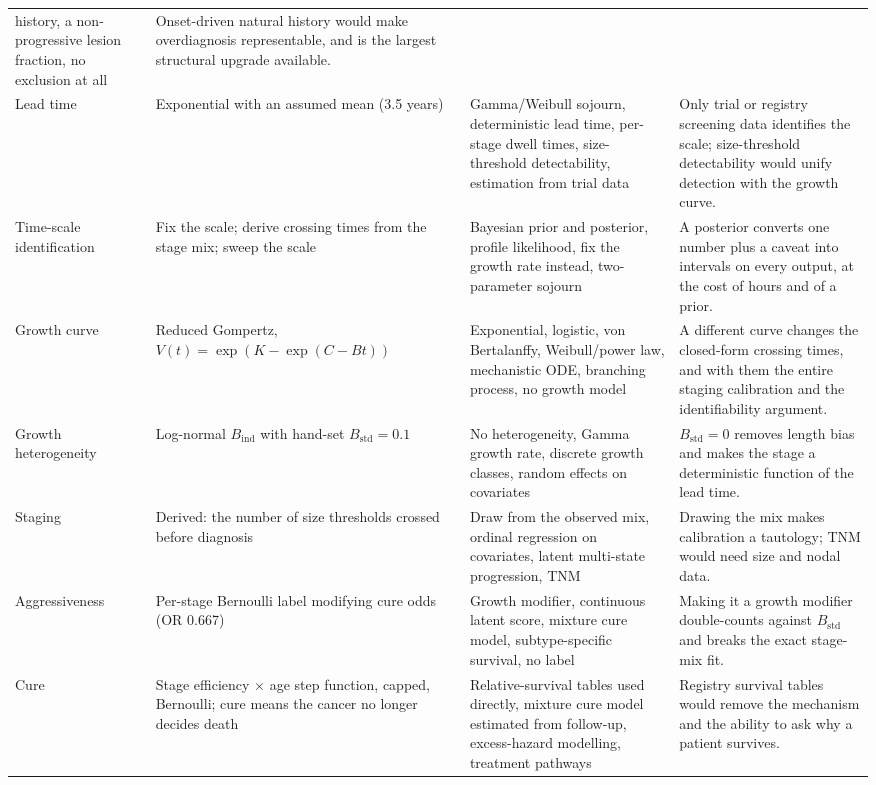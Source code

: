 \documentclass[12pt,a4paper]{article}
\begin{document}
{\begin{longtable}{@{}p{2.3cm}p{4.5cm}p{4.0cm}p{4.0cm}@{}}
history, a non-progressive lesion fraction, no exclusion at all & Onset-driven natural history would make
overdiagnosis representable, and is the largest structural upgrade available. \\
Lead time & Exponential with an assumed mean (3.5 years) & Gamma/Weibull sojourn, deterministic lead time,
per-stage dwell times, size-threshold detectability, estimation from trial data & Only trial or registry
screening data identifies the scale; size-threshold detectability would unify detection with the growth
curve. \\
Time-scale identification & Fix the scale; derive crossing times from the stage mix; sweep the scale &
Bayesian prior and posterior, profile likelihood, fix the growth rate instead, two-parameter sojourn & A
posterior converts one number plus a caveat into intervals on every output, at the cost of hours and of a
prior. \\
Growth curve & Reduced Gompertz, $V(t)=\exp(K-\exp(C-Bt))$ & Exponential, logistic, von Bertalanffy,
Weibull/power law, mechanistic ODE, branching process, no growth model & A different curve changes the
closed-form crossing times, and with them the entire staging calibration and the identifiability argument. \\
Growth heterogeneity & Log-normal $B_{\text{ind}}$ with hand-set $B_{\text{std}}=0.1$ & No heterogeneity,
Gamma growth rate, discrete growth classes, random effects on covariates & $B_{\text{std}}=0$ removes length
bias and makes the stage a deterministic function of the lead time. \\
Staging & Derived: the number of size thresholds crossed before diagnosis & Draw from the observed mix,
ordinal regression on covariates, latent multi-state progression, TNM & Drawing the mix makes calibration a
tautology; TNM would need size and nodal data. \\
Aggressiveness & Per-stage Bernoulli label modifying cure odds (OR 0.667) & Growth modifier, continuous
latent score, mixture cure model, subtype-specific survival, no label & Making it a growth modifier
double-counts against $B_{\text{std}}$ and breaks the exact stage-mix fit. \\
Cure & Stage efficiency $\times$ age step function, capped, Bernoulli; cure means the cancer no longer
decides death & Relative-survival tables used directly, mixture cure model estimated from follow-up,
excess-hazard modelling, treatment pathways & Registry survival tables would remove the mechanism and the
ability to ask why a patient survives. \\

\end{longtable}}
\end{document}
